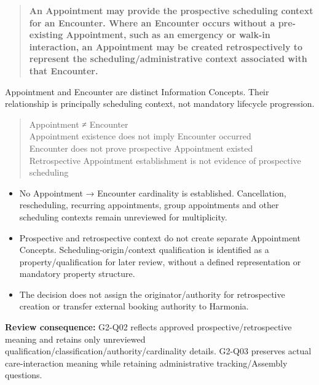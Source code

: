 \begin{quote}


\textbf{An Appointment may provide the prospective scheduling context for an Encounter. Where an Encounter occurs without a pre-existing Appointment, such as an emergency or walk-in interaction, an Appointment may be created retrospectively to represent the scheduling/administrative context associated with that Encounter.}



\end{quote}


Appointment and Encounter are distinct Information Concepts. Their relationship is principally scheduling context, not mandatory lifecycle progression.



\begin{quote}\small\ttfamily
Appointment ≠ Encounter\\
Appointment existence does not imply Encounter occurred\\
Encounter does not prove prospective Appointment existed\\
Retrospective Appointment establishment is not evidence of prospective scheduling\\

\end{quote}


\begin{itemize}


\item No Appointment → Encounter cardinality is established. Cancellation, rescheduling, recurring appointments, group appointments and other scheduling contexts remain unreviewed for multiplicity.

\item Prospective and retrospective context do not create separate Appointment Concepts. Scheduling-origin/context qualification is identified as a property/qualification for later review, without a defined representation or mandatory property structure.

\item The decision does not assign the originator/authority for retrospective creation or transfer external booking authority to Harmonia.

\end{itemize}


\textbf{Review consequence:} G2-Q02 reflects approved prospective/retrospective meaning and retains only unreviewed qualification/classification/authority/cardinality details. G2-Q03 preserves actual care-interaction meaning while retaining administrative tracking/Assembly questions.



